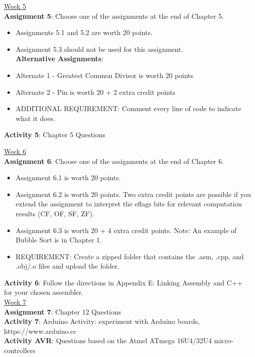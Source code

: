 \documentclass[11pt]{article}
\begin{document}
\underline {Week 5} \\
\textbf {Assignment 5}: Choose one of the assignments at the end of Chapter 5.
\begin{itemize} \itemsep -1.5em
	\item Assignments 5.1 and 5.2 are worth 20 points. \\
	\item Assignment 5.3 should not be used for this assignment. \\
\textbf {Alternative Assignments}: \\
		\item Alternate 1 - Greatest Common Divisor is worth 20 points \\
		\item Alternate 2 - Pin is worth 20 + 2 extra credit points \\
	\item ADDITIONAL REQUIREMENT: Comment every line of code to indicate what it does.
\end{itemize}

\textbf {Activity 5}: Chapter 5 Questions \\

\newpage

\underline {Week 6} \\
\textbf {Assignment 6}: Choose one of the assignments at the end of Chapter 6.
\begin{itemize} \itemsep -1.5em
	\item Assignment 6.1 is worth 20 points. \\
	\item Assignment 6.2 is worth 20 points. Two extra credit points are possible if you extend the assignment to interpret the eflags bits for relevant computation results (CF, OF, SF, ZF). \\
	\item Assignment 6.3 is worth 20 + 4 extra credit points.  Note: An example of Bubble Sort is in Chapter 1. \\
	\item REQUIREMENT: Create a zipped folder that contains the .asm, .cpp, and .obj/.o files and upload the folder.
\end{itemize}

\textbf {Activity 6}: Follow the directions in Appendix E: Linking Assembly and C++ for your chosen assembler. \\

\underline {Week 7} \\
\textbf {Assignment 7}: Chapter 12 Questions \\
\textbf {Activity 7}: Arduino Activity: experiment with Arduino boards, https://www.arduino.cc \\
\textbf {Activity AVR}: Questions based on the Atmel ATmega 16U4/32U4 micro-controllers \\
\end{document}
